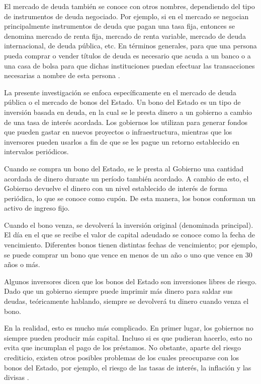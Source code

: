    El mercado de deuda también se conoce con otros nombres, dependiendo del tipo de instrumentos de deuda negociado. Por ejemplo, si en el mercado se negocian principalmente instrumentos de deuda que pagan una tasa fija, entonces se denomina mercado de renta fija, mercado de renta variable, mercado de deuda internacional, de deuda pública, etc. En términos generales, para que una persona pueda comprar o vender títulos de deuda es necesario que acuda a un banco o a una casa de bolsa para que dichas instituciones puedan efectuar las transacciones necesarias a nombre de esta persona \parencite{bancomexico}.

    La presente investigación se enfoca específicamente en el mercado de deuda pública o el mercado de bonos del Estado. Un bono del Estado es un tipo de inversión basada en deuda, en la cual se le presta dinero a un gobierno a cambio de una tasa de interés acordada. Los gobiernos los utilizan para generar fondos que pueden gastar en nuevos proyectos o infraestructura, mientras que los inversores pueden usarlos a fin de que se les pague un retorno establecido en intervalos periódicos.

    Cuando se compra un bono del Estado, se le presta al Gobierno una cantidad acordada de dinero durante un período también acordado. A cambio de esto, el Gobierno devuelve el dinero con un nivel establecido de interés de forma periódica, lo que se conoce como cupón. De esta manera, los bonos conforman un activo de ingreso fijo.

    Cuando el bono venza, se devolverá la inversión original (denominada principal). El día en el que se recibe el valor de capital adeudado se conoce como la fecha de vencimiento. Diferentes bonos tienen distintas fechas de vencimiento; por ejemplo, se puede comprar un bono que vence en menos de un año o uno que vence en 30 años o más.

    Algunos inversores dicen que los bonos del Estado son inversiones libres de riesgo. Dado que un gobierno siempre puede imprimir más 
    dinero para saldar sus deudas, teóricamente hablando, siempre se devolverá tu dinero cuando venza el bono.

    En la realidad, esto es mucho más complicado. En primer lugar, los gobiernos no siempre pueden producir más capital. Incluso si es 
    que pudieran hacerlo, esto no evita que incumplan el pago de los préstamos. No obstante, aparte del riesgo crediticio, existen otros 
    posibles problemas de los cuales preocuparse con los bonos del Estado, por ejemplo, el riesgo de las tasas de interés, la inflación 
    y las divisas \parencite{igbonos}.

